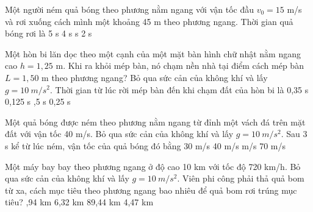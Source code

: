 \begin{vidu} %
Một người ném quả bóng theo phương nằm ngang với vận tốc đầu $v_0 = 15$ m/s và rơi xuống cách mình một khoảng 45 m theo phương ngang. Thời gian quả bóng rơi là
\choice
{5 s}
{4 s}
{ s}
{2 s}
\end{vidu}
\begin{vidu} %
Một hòn bi lăn dọc theo một cạnh của một mặt bàn hình chữ nhật nằm ngang cao $h = 1,25$ m. Khi ra khỏi mép bàn, nó chạm nền nhà tại điểm cách mép bàn $L = 1,50$ m theo phương ngang? Bỏ qua sức cản của không khí và lấy $g = 10\ m/s^2$. Thời gian từ lúc rời mép bàn đến khi chạm đất của hòn bi là
\choice
{0,35 s}
{0,125 s}
{,5 s}
{0,25 s}
\end{vidu}
\begin{vidu} %
Một quả bóng được ném theo phương nằm ngang từ đỉnh một vách đá trên mặt đất với vận tốc 40 m/s. Bỏ qua sức cản của không khí và lấy $g = 10\ m/s^2$. Sau 3 s kể từ lúc ném, vận tốc của quả bóng đó bằng
\choice
{30 m/s}
{40 m/s}
{ m/s}
{70 m/s}
\end{vidu}
\begin{vidu} %
Một máy bay bay theo phương ngang ở độ cao 10 km với tốc độ 720 km/h.  Bỏ qua sức cản của không khí và lấy $g = 10\ m/s^2$. Viên phi công phải thả quả bom từ xa, cách mục tiêu theo phương ngang bao nhiêu để quả bom rơi trúng mục tiêu?
\choice
{,94 km}
{6,32 km}
{89,44 km}
{4,47 km}
\end{vidu}
